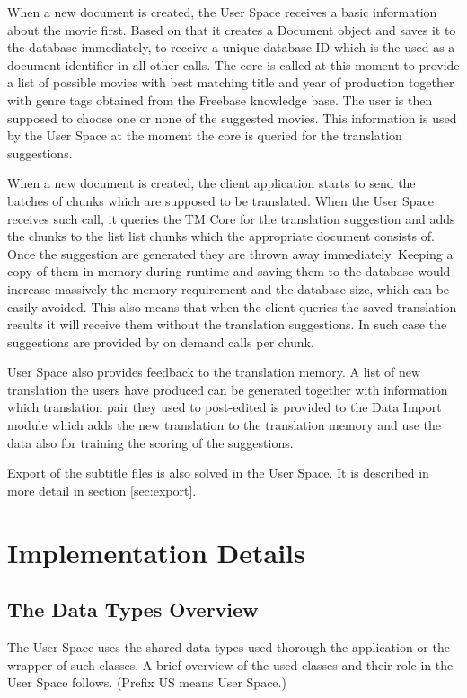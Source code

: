 When a new document is created, the User Space receives a basic information about the movie first. Based on that it creates a Document object and saves it to the database immediately, to receive a unique  database ID which is the used as a document identifier in all other calls. The core is called at this moment to provide a list of possible movies with best matching title and year of production together with genre tags obtained from the Freebase knowledge base. The user is then supposed to choose one or none of the suggested movies. This information is used by the User Space at the moment the core is queried for the translation suggestions.

When a new document is created, the client application starts to send the batches of chunks which are supposed to be translated. When the User Space receives such call, it queries the TM Core for the translation suggestion and adds the chunks to the list list chunks which the appropriate document consists of. Once the suggestion are generated they are thrown away immediately. Keeping a copy of them in memory during runtime and saving them to the database would increase massively the memory requirement and the database size, which can be easily avoided. This also means that when the client queries the saved translation results it will receive them without the translation suggestions. In such case the suggestions are provided by on demand calls per chunk. 

User Space also provides feedback to the translation memory. A list of new translation the users have produced can be generated together with information which translation pair they used to post-edited is provided to the Data Import module which adds the new translation to the translation memory and use the data also for training the scoring of the suggestions. 

Export of the subtitle files is also solved in the User Space. It is described in more detail in section \ref{sec:export}.

\section{Implementation Details}
\subsection{The Data Types Overview}

The User Space uses the shared data types used thorough the application or the wrapper of such classes. A brief overview of the used classes and their role in the User Space follows. (Prefix US means User Space.)

